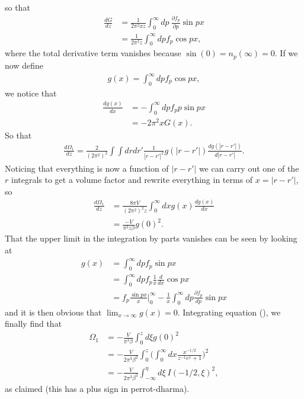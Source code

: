 \documentclass[11pt,twosided]{article}
\begin{document}
so that
\begin{align}
\frac{dG}{dz} &= \frac{1}{2\pi^2xz}\int_0^{\infty} d p \ \frac{\partial f_p}{\partial p} \sin px \\
			  &= \frac{1}{2\pi^2z}\int_0^{\infty} d p f_p \cos px,
\end{align}
where the total derivative term vanishes because $\sin (0) = n_p(\infty) = 0$.
If we now define
\begin{align}
g(x) = \int_0^{\infty} d p f_p \cos px,
\end{align}
we notice that
\begin{align}
\frac{dg(x)}{dx} &= -\int_0^{\infty} d p f_p p \sin px\\
				&= -2\pi^2 x G(x).
\end{align}
So that
\begin{align}
\frac{d\Omega_1}{dz} = \frac{2}{(2\pi^2)^2}\int \int dr dr' \frac{1}{|r-r'|^2} g(|r-r'|) \frac{dg(|r-r'|)}{d|r-r'|}.
\end{align}
Noticing that everything is now a function of $|r-r'|$ we can carry out one of the $r$ integrals to get a volume factor and rewrite everything in terms of $x = |r-r'|$, so
\begin{align}
\frac{d\Omega_1}{dz} &= \frac{8\pi V}{(2\pi^2)^2z} \int_0^{\infty} d x g(x) \frac{dg(x)}{dx}\\
					 &= \frac{-V}{\pi^3z\beta} g(0)^2.
\end{align}
That the upper limit in the integration by parts vanishes can be seen by looking at
\begin{align}
g(x) &= \int_0^{\infty} dp f_p \sin px\\
								&= \int_0^{\infty} dp f_p \frac{1}{x}\frac{d}{dx}\cos px\\
								&= f_p \frac{\sin px}{x}\big|_0^{\infty} - \frac{1}{x}\int_0^\infty d p \frac{\partial f_p}{d p} \sin px
\end{align}
and it is then obvious that $\lim_{x\rightarrow\infty} g(x) = 0$.
Integrating equation (), we finally find that
\begin{align}
\Omega_1 &= -\frac{V}{\pi^3\beta}\int_0^{z} d\xi g(0)^2\\
 		 &= -\frac{V}{2\pi^3\beta^2}\int_0^{z} \Big(\int_0^{\infty}dx\frac{x^{-1/2} }{z^{-1} e^x + 1}\Big)^2\\
 		 &= -\frac{V}{2\pi^3\beta^2}\int_{-\infty}^{\eta} d\xi \ I(-1/2, \xi)^2,
\end{align}
as claimed (this has a plus sign in perrot-dharma).
\end{document}
